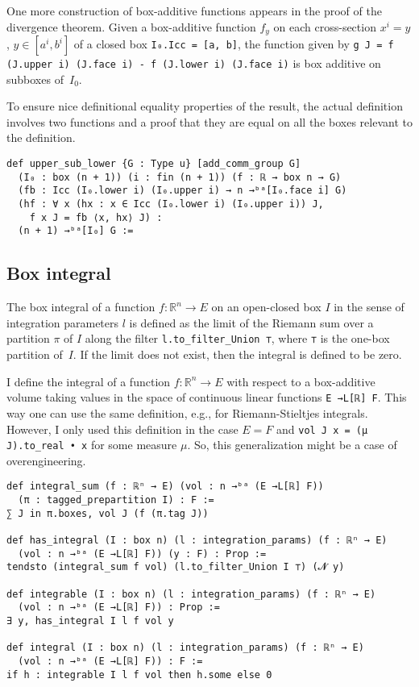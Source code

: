 \documentclass[a4paper, UKenglish,cleveref, autoref, thm-restate]{lipics-v2021}
\newcommand{\bbR}{\mathbb{R}}
\begin{document}
One more construction of box-additive functions appears in the proof
of the divergence theorem. Given a box-additive function \(f_{y}\) on
each cross-section \(x^{i}=y\), \(y \in [a^{i}, b^{i}]\) of a closed
box \lstinline~I₀.Icc = [a, b]~, the function given by
\lstinline~g J = f (J.upper i) (J.face i) - f (J.lower i) (J.face i)~
is box additive on subboxes of~\(I_{0}\).

To ensure nice definitional equality properties of the result, the
actual definition involves two functions and a proof that they are
equal on all the boxes relevant to the definition.

\begin{lstlisting}
def upper_sub_lower {G : Type u} [add_comm_group G]
  (I₀ : box (n + 1)) (i : fin (n + 1)) (f : ℝ → box n → G)
  (fb : Icc (I₀.lower i) (I₀.upper i) → n →ᵇᵃ[I₀.face i] G)
  (hf : ∀ x (hx : x ∈ Icc (I₀.lower i) (I₀.upper i)) J,
    f x J = fb ⟨x, hx⟩ J) :
  (n + 1) →ᵇᵃ[I₀] G :=
\end{lstlisting}

\subsection{Box integral}%
\label{sec:box-integral}

The box integral of a function \(f\colon\bbR^{n}\to E\) on an
open-closed box \(I\) in the sense of integration parameters \(l\) is
defined as the limit of the Riemann sum over a partition \(\pi\) of
\(I\) along the filter \lstinline=l.to_filter_Union ⊤=, where
\lstinline=⊤= is the one-box partition of~\(I\). If the limit does not
exist, then the integral is defined to be zero.

I define the integral of a function \(f\colon \bbR^{n}\to E\) with
respect to a box-additive volume taking values in the space of
continuous linear functions \lstinline=E →L[ℝ] F=. This way one can
use the same definition, e.g., for Riemann-Stieltjes integrals.
However, I only used this definition in the case \(E=F\) and
\lstinline+vol J x = (μ J).to_real • x+ for some measure \(\mu\). So,
this generalization might be a case of overengineering.

\begin{lstlisting}
def integral_sum (f : ℝⁿ → E) (vol : n →ᵇᵃ (E →L[ℝ] F))
  (π : tagged_prepartition I) : F :=
∑ J in π.boxes, vol J (f (π.tag J))

def has_integral (I : box n) (l : integration_params) (f : ℝⁿ → E)
  (vol : n →ᵇᵃ (E →L[ℝ] F)) (y : F) : Prop :=
tendsto (integral_sum f vol) (l.to_filter_Union I ⊤) (𝓝 y)

def integrable (I : box n) (l : integration_params) (f : ℝⁿ → E)
  (vol : n →ᵇᵃ (E →L[ℝ] F)) : Prop :=
∃ y, has_integral I l f vol y

def integral (I : box n) (l : integration_params) (f : ℝⁿ → E)
  (vol : n →ᵇᵃ (E →L[ℝ] F)) : F :=
if h : integrable I l f vol then h.some else 0
\end{lstlisting}
\end{document}
